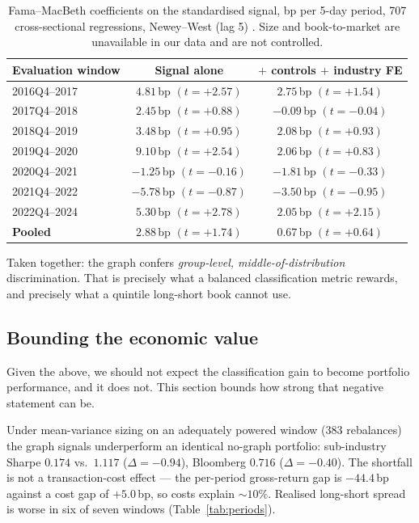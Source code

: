 \begin{table}[h]
\centering
\begin{tabular}{lcc}
\toprule
Evaluation window & Signal alone & $+$ controls $+$ industry FE \\
\midrule
2016Q4--2017 & $4.81$\,bp $(t{=}{+}2.57)$ & $2.75$\,bp $(t{=}{+}1.54)$ \\
2017Q4--2018 & $2.45$\,bp $(t{=}{+}0.88)$ & $-0.09$\,bp $(t{=}{-}0.04)$ \\
2018Q4--2019 & $3.48$\,bp $(t{=}{+}0.95)$ & $2.08$\,bp $(t{=}{+}0.93)$ \\
2019Q4--2020 & $9.10$\,bp $(t{=}{+}2.54)$ & $2.06$\,bp $(t{=}{+}0.83)$ \\
2020Q4--2021 & $-1.25$\,bp $(t{=}{-}0.16)$ & $-1.81$\,bp $(t{=}{-}0.33)$ \\
2021Q4--2022 & $-5.78$\,bp $(t{=}{-}0.87)$ & $-3.50$\,bp $(t{=}{-}0.95)$ \\
2022Q4--2024 & $5.30$\,bp $(t{=}{+}2.78)$ & $2.05$\,bp $(t{=}{+}2.15)$ \\
\midrule
\textbf{Pooled} & $\mathbf{2.88}$\,bp $(t{=}{+}1.74)$ & $\mathbf{0.67}$\,bp $(t{=}{+}0.64)$ \\
\bottomrule
\end{tabular}
\caption{Fama--MacBeth coefficients on the standardised signal, bp per
5-day period, 707 cross-sectional regressions, Newey--West (lag 5)
\citep{newey1987simple}.
Size and book-to-market \citep{fama1993common} are unavailable in our
data and are not controlled.}
\label{tab:fm}
\end{table}

Taken together: the graph confers \emph{group-level, middle-of-distribution}
discrimination. That is precisely what a balanced classification metric
rewards, and precisely what a quintile long-short book cannot use.

\subsection{Bounding the economic value}
\label{sec:bound}
Given the above, we should not expect the classification gain to become
portfolio performance, and it does not. This section bounds how strong that
negative statement can be.

Under mean-variance sizing on an adequately powered window (383 rebalances)
the graph signals underperform an identical no-graph portfolio: sub-industry
Sharpe $0.174$ vs.\ $1.117$ ($\Delta=-0.94$), Bloomberg $0.716$
($\Delta=-0.40$). The shortfall is not a transaction-cost effect --- the
per-period gross-return gap is $-44.4$\,bp against a cost gap of
$+5.0$\,bp, so costs explain ${\sim}10\%$. Realised long-short spread is
worse in six of seven windows (Table~\ref{tab:periods}).

